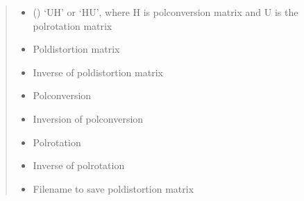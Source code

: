 \documentclass[letterpaper,10pt,english]{sphinxmanual}
\begin{document}
\begin{fulllineitems}
\begin{fulllineitems}
\begin{quote}
\begin{description}
\begin{itemize}
\item {} 
\sphinxAtStartPar
{} () \textendash{} ‘UH’ or ‘HU’, where H is polconversion matrix and U is the polrotation matrix

\end{itemize}

\item[{Returns}] \leavevmode
\sphinxAtStartPar
\begin{itemize}
\item {} 
\sphinxAtStartPar
{} \textendash{} Poldistortion matrix

\item {} 
\sphinxAtStartPar
{} \textendash{} Inverse of poldistortion matrix

\item {} 
\sphinxAtStartPar
{} \textendash{} Polconversion

\item {} 
\sphinxAtStartPar
{} \textendash{} Inversion of polconversion

\item {} 
\sphinxAtStartPar
{} \textendash{} Polrotation

\item {} 
\sphinxAtStartPar
{} \textendash{} Inverse of polrotation

\item {} 
\sphinxAtStartPar
{} \textendash{} Filename to save poldistortion matrix

\end{itemize}


\end{description}\end{quote}

\end{fulllineitems}



\end{fulllineitems}
\end{document}
